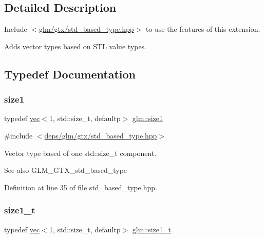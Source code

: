 \subsection{Detailed Description}
Include $<$\hyperlink{std__based__type_8hpp}{glm/gtx/std\+\_\+based\+\_\+type.\+hpp}$>$ to use the features of this extension.

Adds vector types based on S\+TL value types. 

\subsection{Typedef Documentation}
\mbox{\label{group__gtx__std__based__type_gaf471290b8165697d088a943263fc8af1}} 
\subsubsection{\texorpdfstring{size1}{size1}}
{\footnotesize\ttfamily typedef \hyperlink{structglm_1_1vec}{vec}$<$1, std\+::size\+\_\+t, defaultp$>$ \hyperlink{group__gtx__std__based__type_gaf471290b8165697d088a943263fc8af1}{glm\+::size1}}



{\ttfamily \#include $<$\hyperlink{std__based__type_8hpp}{deps/glm/gtx/std\+\_\+based\+\_\+type.\+hpp}$>$}

Vector type based of one std\+::size\+\_\+t component. \begin{DoxySeeAlso}{See also}
G\+L\+M\+\_\+\+G\+T\+X\+\_\+std\+\_\+based\+\_\+type 
\end{DoxySeeAlso}


Definition at line 35 of file std\+\_\+based\+\_\+type.\+hpp.

\mbox{\label{group__gtx__std__based__type_ga5bf40bbca3cb66bbd7cc0c389c3c0c56}} 
\subsubsection{\texorpdfstring{size1\+\_\+t}{size1\_t}}
{\footnotesize\ttfamily typedef \hyperlink{structglm_1_1vec}{vec}$<$1, std\+::size\+\_\+t, defaultp$>$ \hyperlink{group__gtx__std__based__type_ga5bf40bbca3cb66bbd7cc0c389c3c0c56}{glm\+::size1\+\_\+t}}



